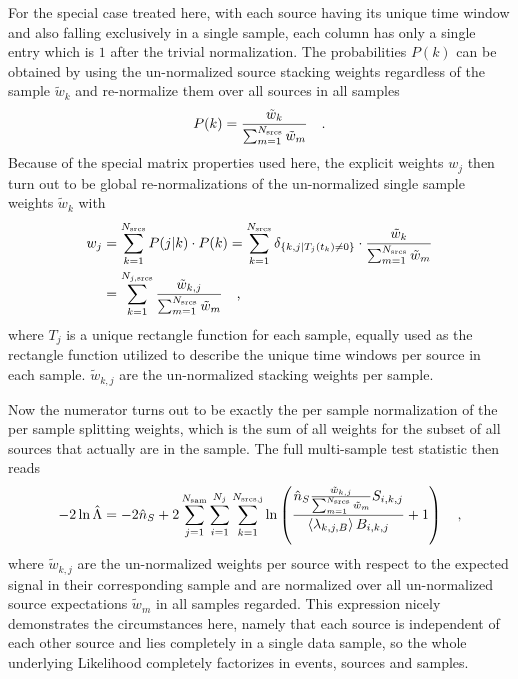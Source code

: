 For the special case treated here, with each source having its unique time window and also falling exclusively in a single sample, each column has only a single entry which is $1$ after the trivial normalization.
The probabilities $P(k)$ can be obtained by using the un-normalized source stacking weights regardless of the sample $\tilde{w}_k$ and re-normalize them over all sources in all samples
\begin{equation}
  P(k) = \frac{\tilde{w}_k}{\sum_{m=1}^{N_\text{srcs}} \tilde{w}_m}
  \quad\text{.}
\end{equation}
Because of the special matrix properties used here, the explicit weights $w_j$ then turn out to be global re-normalizations of the un-normalized single sample weights $\tilde{w}_k$ with
\begin{align}
  w_j
    &= \sum_{k=1}^{N_\text{srcs}} P(j|k)\cdot P(k)
    = \sum_{k=1}^{N_\text{srcs}}
      \delta_{\{k,j|T_j(t_k)\neq 0\}} \cdot
      \frac{\tilde{w}_k}{\sum_{m=1}^{N_\text{srcs}} \tilde{w}_m} \\
    &= \sum_{k=1}^{N_{j,\text{srcs}}}
      \frac{\tilde{w}_{k,j}}{\sum_{m=1}^{N_\text{srcs}} \tilde{w}_m}
  \quad\text{,}
\end{align}
where $T_j$ is a unique rectangle function for each sample, equally used as the rectangle function utilized to describe the unique time windows per source in each sample.
$\tilde{w}_{k,j}$ are the un-normalized stacking weights per sample.

Now the numerator turns out to be exactly the per sample normalization of the per sample splitting weights, which is the sum of all weights for the subset of all sources that actually are in the sample.
The full multi-sample test statistic then reads
\begin{equation}
  \label{equ:tdep_llh_multi_sample_complete}
  -2\ln\hat{\Lambda}
  = -2\hat{n}_S +
      2\sum_{j=1}^{N_\text{sam}} \sum_{i=1}^{N_j} \sum_{k=1}^{N_\text{srcs,j}}
      \ln\left(
        \frac{\hat{n}_{S}\frac{\tilde{w}_{k,j}}{\sum_{m=1}^{N_\text{srcs}}
              \tilde{w}_m} S_{i,k,j}}
             {\Braket{\lambda_{k,j,B}} B_{i,k,j}}
        + 1
      \right)
  \quad\text{,}
\end{equation}
where $\tilde{w}_{k,j}$ are the un-normalized weights per source with respect to the expected signal in their corresponding sample and are normalized over all un-normalized source expectations $\tilde{w}_m$ in all samples regarded.
This expression nicely demonstrates the circumstances here, namely that each source is independent of each other source and lies completely in a single data sample, so the whole underlying Likelihood completely factorizes in events, sources and samples.



